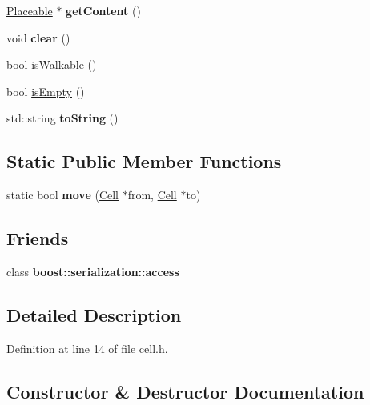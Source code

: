 \begin{DoxyCompactItemize}
\hypertarget{class_cell_af1ac11342618275ec6684261e661cb52}{}\label{class_cell_af1ac11342618275ec6684261e661cb52} 
\hyperlink{class_placeable}{Placeable} $\ast$ {\bfseries get\+Content} ()
\item 
\hypertarget{class_cell_a275274592fde050fefcda8515b5a8d3f}{}\label{class_cell_a275274592fde050fefcda8515b5a8d3f} 
void {\bfseries clear} ()
\item 
bool \hyperlink{class_cell_af8625542ca100de4cc6e221ea131f05c}{is\+Walkable} ()
\item 
bool \hyperlink{class_cell_a6c7344ef2aa917e70364221bf86ff8bc}{is\+Empty} ()
\item 
\hypertarget{class_cell_a115541b42cd152e9557d527f6ea3e471}{}\label{class_cell_a115541b42cd152e9557d527f6ea3e471} 
std\+::string {\bfseries to\+String} ()
\end{DoxyCompactItemize}
\subsection*{Static Public Member Functions}
\begin{DoxyCompactItemize}
\item 
\hypertarget{class_cell_a1790df33d948969ca983970e1ae91f1b}{}\label{class_cell_a1790df33d948969ca983970e1ae91f1b} 
static bool {\bfseries move} (\hyperlink{class_cell}{Cell} $\ast$from, \hyperlink{class_cell}{Cell} $\ast$to)
\end{DoxyCompactItemize}
\subsection*{Friends}
\begin{DoxyCompactItemize}
\item 
\hypertarget{class_cell_ac98d07dd8f7b70e16ccb9a01abf56b9c}{}\label{class_cell_ac98d07dd8f7b70e16ccb9a01abf56b9c} 
class {\bfseries boost\+::serialization\+::access}
\end{DoxyCompactItemize}


\subsection{Detailed Description}


Definition at line 14 of file cell.\+h.



\subsection{Constructor \& Destructor Documentation}
\hypertarget{class_cell_a3c614b825bdf6a24d4a3e2e52b310568}{}\label{class_cell_a3c614b825bdf6a24d4a3e2e52b310568} 
